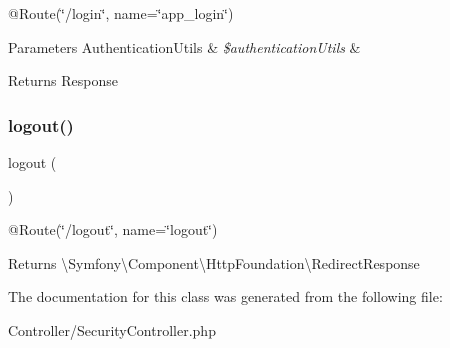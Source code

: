 @\+Route(\char`\"{}/login\char`\"{}, name=\char`\"{}app\+\_\+login\char`\"{}) 
\begin{DoxyParams}[1]{Parameters}
Authentication\+Utils & {\em \$authentication\+Utils} & \\
\hline
\end{DoxyParams}
\begin{DoxyReturn}{Returns}
Response 
\end{DoxyReturn}
\mbox{\label{class_app_1_1_controller_1_1_security_controller_a082405d89acd6835c3a7c7a08a7adbab}} 
\subsubsection{\texorpdfstring{logout()}{logout()}}
{\footnotesize\ttfamily logout (\begin{DoxyParamCaption}{ }\end{DoxyParamCaption})}

@\+Route(\char`\"{}/logout\char`\"{}, name=\char`\"{}logout\char`\"{}) \begin{DoxyReturn}{Returns}
\textbackslash{}\+Symfony\textbackslash{}\+Component\textbackslash{}\+Http\+Foundation\textbackslash{}\+Redirect\+Response 
\end{DoxyReturn}


The documentation for this class was generated from the following file\+:\begin{DoxyCompactItemize}
\item 
Controller/Security\+Controller.\+php\end{DoxyCompactItemize}
